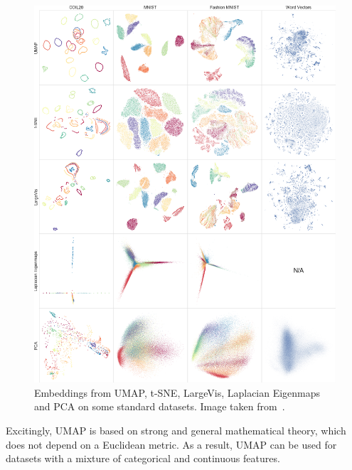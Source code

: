 \documentclass[a4paper,11pt,leqno]{article} \usepackage{amsmath}
\theoremstyle{definition}
\begin{document}
\begin{figure}
  \centering
  \includegraphics[width=1.05\textwidth]{figures/dim-red-comparison-nips.png}
  \caption{Embeddings from UMAP, t-SNE, LargeVis, Laplacian Eigenmaps and PCA
  on some standard datasets. Image taken from~\cite{McInnes18}.}
  \label{fig_example_embedding}
\end{figure}

Excitingly, UMAP is based on strong and general mathematical theory, which does
not depend on a Euclidean metric.
As a result, UMAP can be used for datasets with a mixture of categorical and
continuous features.
\end{document}
